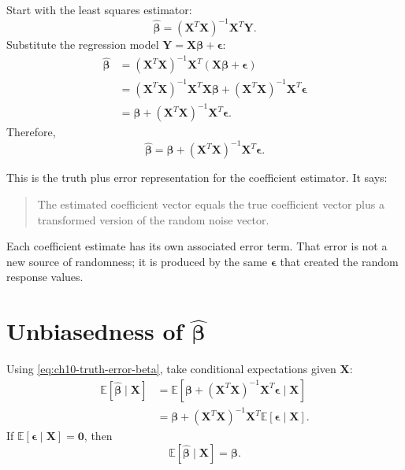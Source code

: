 Start with the least squares estimator:
\begin{equation}
  \widehat{\boldsymbol{\beta}}
  =(\mathbf{X}^T\mathbf{X})^{-1}\mathbf{X}^T\mathbf{Y}.
\end{equation}
Substitute the regression model \(\mathbf{Y}=\mathbf{X}\boldsymbol{\beta}+\boldsymbol{\epsilon}\):
\begin{align}
  \widehat{\boldsymbol{\beta}}
  &=(\mathbf{X}^T\mathbf{X})^{-1}\mathbf{X}^T
  (\mathbf{X}\boldsymbol{\beta}+\boldsymbol{\epsilon}) \\
  &=(\mathbf{X}^T\mathbf{X})^{-1}\mathbf{X}^T\mathbf{X}\boldsymbol{\beta}
  +(\mathbf{X}^T\mathbf{X})^{-1}\mathbf{X}^T\boldsymbol{\epsilon} \\
  &=\boldsymbol{\beta}
  +(\mathbf{X}^T\mathbf{X})^{-1}\mathbf{X}^T\boldsymbol{\epsilon}.
\end{align}
Therefore,
\begin{equation}
  \boxed{
  \widehat{\boldsymbol{\beta}}
  =\boldsymbol{\beta}
  +(\mathbf{X}^T\mathbf{X})^{-1}\mathbf{X}^T\boldsymbol{\epsilon}.
  }
  \label{eq:ch10-truth-error-beta}
\end{equation}

This is the truth plus error representation for the coefficient estimator.  It says:
\begin{quote}
  The estimated coefficient vector equals the true coefficient vector plus a transformed version of the random noise vector.
\end{quote}

Each coefficient estimate has its own associated error term.  That error is not a new source of randomness; it is produced by the same \(\boldsymbol{\epsilon}\) that created the random response values.

\section{Unbiasedness of \texorpdfstring{\(\widehat{\boldsymbol{\beta}}\)}{beta-hat}}

Using \eqref{eq:ch10-truth-error-beta}, take conditional expectations given \(\mathbf{X}\):
\begin{align}
  \mathbb{E}[\widehat{\boldsymbol{\beta}}\mid\mathbf{X}]
  &=\mathbb{E}\left[
  \boldsymbol{\beta}
  +(\mathbf{X}^T\mathbf{X})^{-1}\mathbf{X}^T\boldsymbol{\epsilon}
  \mid\mathbf{X}\right] \\
  &=\boldsymbol{\beta}
  +(\mathbf{X}^T\mathbf{X})^{-1}\mathbf{X}^T
  \mathbb{E}[\boldsymbol{\epsilon}\mid\mathbf{X}].
\end{align}
If \(\mathbb{E}[\boldsymbol{\epsilon}\mid\mathbf{X}]=\mathbf{0}\), then
\begin{equation}
  \boxed{
  \mathbb{E}[\widehat{\boldsymbol{\beta}}\mid\mathbf{X}]
  =\boldsymbol{\beta}.
  }
\end{equation}

